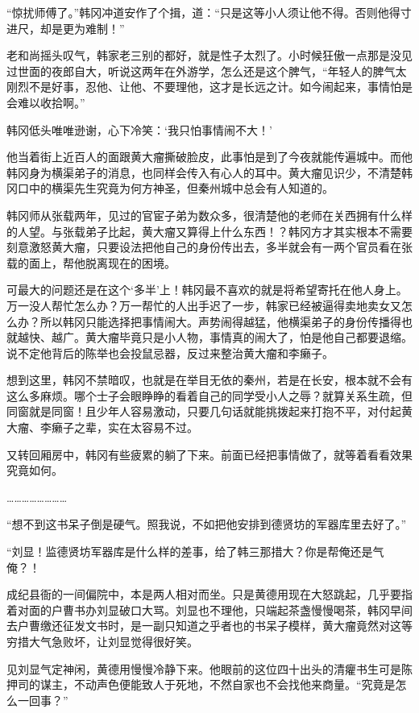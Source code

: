 “惊扰师傅了。”韩冈冲道安作了个揖，道：“只是这等小人须让他不得。否则他得寸进尺，却是更为难制！”

老和尚摇头叹气，韩家老三别的都好，就是性子太烈了。小时候狂傲一点那是没见过世面的夜郎自大，听说这两年在外游学，怎么还是这个脾气，“年轻人的脾气太刚烈不是好事，忍他、让他、不要理他，这才是长远之计。如今闹起来，事情怕是会难以收拾啊。”

韩冈低头唯唯逊谢，心下冷笑：‘我只怕事情闹不大！’

他当着街上近百人的面跟黄大瘤撕破脸皮，此事怕是到了今夜就能传遍城中。而他韩冈身为横渠弟子的消息，也同样会传入有心人的耳中。黄大瘤见识少，不清楚韩冈口中的横渠先生究竟为何方神圣，但秦州城中总会有人知道的。

韩冈师从张载两年，见过的官宦子弟为数众多，很清楚他的老师在关西拥有什么样的人望。与张载弟子比起，黄大瘤又算得上什么东西！？韩冈方才其实根本不需要刻意激怒黄大瘤，只要设法把他自己的身份传出去，多半就会有一两个官员看在张载的面上，帮他脱离现在的困境。

可最大的问题还是在这个‘多半’上！韩冈最不喜欢的就是将希望寄托在他人身上。万一没人帮忙怎么办？万一帮忙的人出手迟了一步，韩家已经被逼得卖地卖女又怎么办？所以韩冈只能选择把事情闹大。声势闹得越猛，他横渠弟子的身份传播得也就越快、越广。黄大瘤毕竟只是小人物，事情真的闹大了，怕是他自己都要退缩。说不定他背后的陈举也会投鼠忌器，反过来整治黄大瘤和李癞子。

想到这里，韩冈不禁暗叹，也就是在举目无依的秦州，若是在长安，根本就不会有这么多麻烦。哪个士子会眼睁睁的看着自己的同学受小人之辱？就算关系生疏，但同窗就是同窗！且少年人容易激动，只要几句话就能挑拨起来打抱不平，对付起黄大瘤、李癞子之辈，实在太容易不过。

又转回厢房中，韩冈有些疲累的躺了下来。前面已经把事情做了，就等着看看效果究竟如何。

……………………

“想不到这书呆子倒是硬气。照我说，不如把他安排到德贤坊的军器库里去好了。”

“刘显！监德贤坊军器库是什么样的差事，给了韩三那措大？你是帮俺还是气俺？！

成纪县衙的一间偏院中，本是两人相对而坐。只是黄德用现在大怒跳起，几乎要指着对面的户曹书办刘显破口大骂。刘显也不理他，只端起茶盏慢慢喝茶，韩冈早间去户曹缴还征发文书时，是一副只知道之乎者也的书呆子模样，黄大瘤竟然对这等穷措大气急败坏，让刘显觉得很好笑。

见刘显气定神闲，黄德用慢慢冷静下来。他眼前的这位四十出头的清癯书生可是陈押司的谋主，不动声色便能致人于死地，不然自家也不会找他来商量。“究竟是怎么一回事？”

